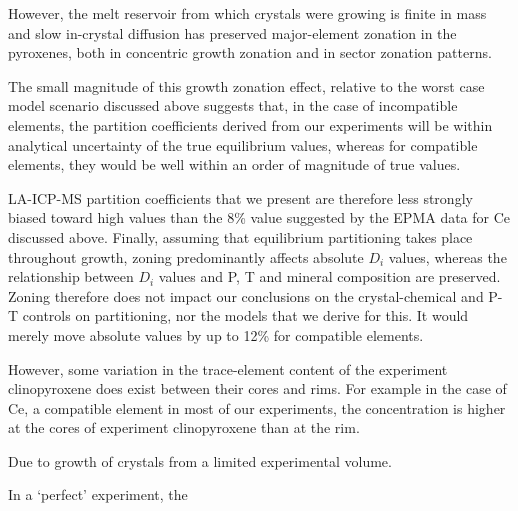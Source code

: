 However, the melt reservoir from which crystals were growing is finite in mass and slow in-crystal diffusion has preserved major-element zonation in the pyroxenes, both in concentric growth zonation and in sector zonation patterns.

   The small magnitude of this growth zonation effect, relative to the worst case model scenario discussed above suggests that, in the case of incompatible elements, the partition coefficients derived from our experiments will be within analytical uncertainty of the true equilibrium values, whereas for compatible elements, they would be well within an order of magnitude of true values.
    

    LA-ICP-MS partition coefficients that we present are therefore less strongly biased toward high values than the 8\% value suggested by the EPMA data for Ce discussed above.
    Finally, assuming that equilibrium partitioning takes place throughout growth, zoning predominantly affects absolute $D_i$ values, whereas the relationship between $D_i$ values and P, T and mineral composition are preserved. Zoning therefore does not impact our conclusions on the crystal-chemical and P-T controls on partitioning, nor the models that we derive for this. It would merely move absolute values by up to 12\% for compatible elements.













However, some variation in the trace-element content of the experiment clinopyroxene does exist between their cores and rims. For example in the case of Ce, a compatible element in most of our experiments, the concentration is higher at the cores of experiment clinopyroxene than at the rim. 




Due to growth of crystals from a limited experimental volume. 

In a `perfect' experiment, the 



